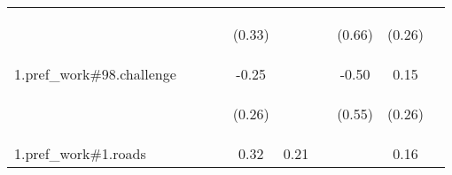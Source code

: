\begin{center}
\begin{tabular}{lccccccccc}
 & \begin{footnotesize}\end{footnotesize} & \begin{footnotesize}\end{footnotesize} & \begin{footnotesize}\end{footnotesize} & \begin{footnotesize}(0.33)\end{footnotesize} & \begin{footnotesize}\end{footnotesize} & \begin{footnotesize}\end{footnotesize} & \begin{footnotesize}(0.66)\end{footnotesize} & \begin{footnotesize}(0.26)\end{footnotesize} & \begin{footnotesize}\end{footnotesize}\\
\noalign{\smallskip}1.pref_work\#98.challenge &  &  &  & -0.25 &  &  & -0.50 & 0.15 & \\
 & \begin{footnotesize}\end{footnotesize} & \begin{footnotesize}\end{footnotesize} & \begin{footnotesize}\end{footnotesize} & \begin{footnotesize}(0.26)\end{footnotesize} & \begin{footnotesize}\end{footnotesize} & \begin{footnotesize}\end{footnotesize} & \begin{footnotesize}(0.55)\end{footnotesize} & \begin{footnotesize}(0.26)\end{footnotesize} & \begin{footnotesize}\end{footnotesize}\\
\noalign{\smallskip}1.pref_work\#1.roads &  &  &  & 0.32 & 0.21 &  &  & 0.16 & \\

\end{tabular}
\end{center}
